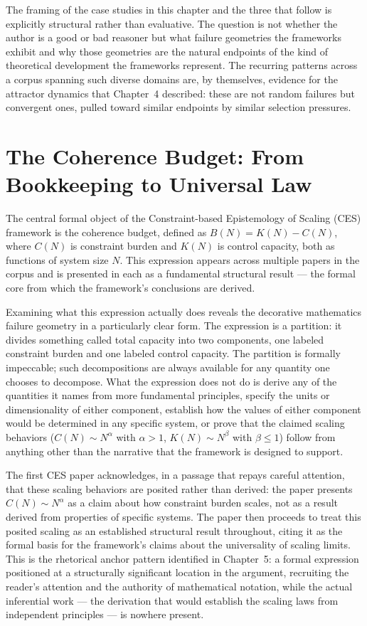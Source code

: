 \documentclass[12pt, openright, twoside]{book}
\begin{document}
The framing of the case studies in this chapter and the three that follow is
explicitly structural rather than evaluative. The question is not whether the
author is a good or bad reasoner but what failure geometries the frameworks
exhibit and why those geometries are the natural endpoints of the kind of
theoretical development the frameworks represent. The recurring patterns across
a corpus spanning such diverse domains are, by themselves, evidence for the
attractor dynamics that Chapter~4 described: these are not random failures but
convergent ones, pulled toward similar endpoints by similar selection pressures.

\section{The Coherence Budget: From Bookkeeping to Universal Law}

The central formal object of the Constraint-based Epistemology of Scaling
(CES) framework is the coherence budget, defined as $B(N) = K(N) - C(N)$,
where $C(N)$ is constraint burden and $K(N)$ is control capacity, both as
functions of system size $N$. This expression appears across multiple papers
in the corpus and is presented in each as a fundamental structural result ---
the formal core from which the framework's conclusions are derived.

Examining what this expression actually does reveals the decorative mathematics
failure geometry in a particularly clear form. The expression is a partition:
it divides something called total capacity into two components, one labeled
constraint burden and one labeled control capacity. The partition is formally
impeccable; such decompositions are always available for any quantity one
chooses to decompose. What the expression does not do is derive any of the
quantities it names from more fundamental principles, specify the units or
dimensionality of either component, establish how the values of either component
would be determined in any specific system, or prove that the claimed scaling
behaviors ($C(N) \sim N^\alpha$ with $\alpha > 1$, $K(N) \sim N^\beta$ with
$\beta \leq 1$) follow from anything other than the narrative that the framework
is designed to support.

The first CES paper acknowledges, in a passage that repays careful attention,
that these scaling behaviors are posited rather than derived: the paper presents
$C(N) \sim N^\alpha$ as a claim about how constraint burden scales, not as a
result derived from properties of specific systems. The paper then proceeds to
treat this posited scaling as an established structural result throughout, citing
it as the formal basis for the framework's claims about the universality of
scaling limits. This is the rhetorical anchor pattern identified in Chapter~5:
a formal expression positioned at a structurally significant location in the
argument, recruiting the reader's attention and the authority of mathematical
notation, while the actual inferential work --- the derivation that would
establish the scaling laws from independent principles --- is nowhere present.
\end{document}
